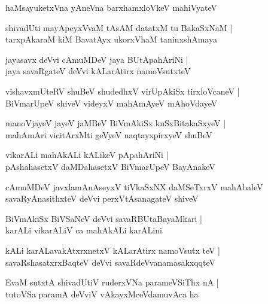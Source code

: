 \begin{shloka}
haMsayuketxVna yAneVna barxhamxloVkeV mahiVyateV
\end{shloka}

\begin{shloka}
shivadUti mayApeyxVvaM tAsAM datatxM tu BakaSxNaM |\\
tarxpAkaraM kiM BavatAyx ukorxVhaM taninxshAmaya 
\end{shloka}

\begin{shloka}
jayasavx deVvi cAmuMDeV jaya BUtApahAriNi |\\
jaya savaRgateV deVvi kALarAtirx namoVsutxteV 
\end{shloka}

\begin{shloka}
vishavxmUteRV shuBeV shudedhxV virUpAkiSx tirxloVcaneV |\\
BiVmarUpeV shiveV videyxV mahAmAyeV mAhoVdayeV
\end{shloka}

\begin{shloka}
manoVjayeV jayeV jaMBeV BiVmAkiSx kuSxBitakaSxyeV |\\
mahAmAri vicitArxMti geVyeV naqtayxpirxyeV shuBeV
\end{shloka}

\begin{shloka}
vikarALi mahAkALi kALikeV pApahAriNi |\\
pAshahasetxV daMDahasetxV BiVmarUpeV BayAnakeV
\end{shloka}

\begin{shloka}
cAmuMDeV javxlamAnAseyxV tiVkaSxNX daMSeTxrxV mahAbaleV \\
savaRyAnasithxteV deVvi perxVtAsanagateV shiveV
\end{shloka}

\begin{shloka}
BiVmAkiSx BiVSaNeV deVvi savaRBUtaBayaMkari |\\
karALi vikarALiV ca mahAkALi karALini
\end{shloka}

\begin{shloka}
kALi karALavakAtxrxnetxV kALarAtirx namoVsutx teV |\\
savaRshasatxrxBaqteV deVvi savaRdeVvanamasakxqqteV 
\end{shloka}

\begin{shloka}
EvaM sutxtA shivadUtiV ruderxVNa parameVSiThx nA |\\
tutoVSa paramA deVviV vAkayxMceVdamuvAca ha 
\end{shloka}


